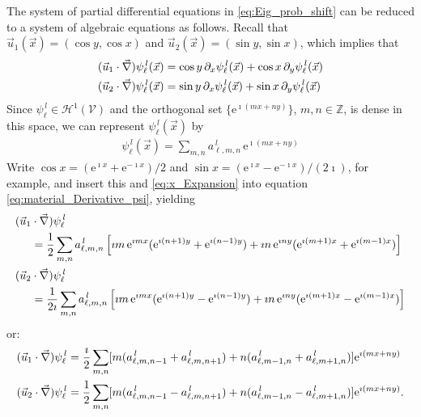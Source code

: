 \documentclass{article}
\newcommand{\e}{\mathrm{e}}
\newcommand{\Hc}{\mathcal{H}}
\newcommand{\Vc}{\mathcal{V}}
\newcommand{\0}{\mathbf{0}}
\newcommand{\1}{\mathbf{1}}
\newcommand{\2}{\mathbf{2}}
\newcommand{\3}{\mathbf{3}}
\newcommand{\4}{\mathbf{4}}
\newcommand{\5}{\mathbf{5}}
\newcommand{\6}{\mathbf{6}}
\newcommand{\7}{\mathbf{7}}
\newcommand{\8}{\mathbf{8}}
\begin{document}
The system of partial differential equations in
\eqref{eq:Eig_prob_shift} can be reduced to a system of algebraic
equations as follows. Recall that
$\vec{u}_1(\vec{x})=(\cos{y},\cos{x})$ and
$\vec{u}_2(\vec{x})=(\sin{y},\sin{x})$, which implies that
%
\begin{align}\label{eq:material_Derivative_psi}
  (\vec{u}_1\cdot\vec{\nabla})\psi_\ell^{\,l}(\vec{x})
          &=\cos{y}\,\partial_x\psi_\ell^{\,l}(\vec{x})+\cos{x}\,\partial_y\psi_\ell^{\,l}(\vec{x})\\
  (\vec{u}_2\cdot\vec{\nabla})\psi_\ell^{\,l}(\vec{x})
          &=\sin{y}\,\partial_x\psi_\ell^{\,l}(\vec{x})+\sin{x}\,\partial_y\psi_\ell^{\,l}(\vec{x})\notag
\end{align}
%
Since $\psi_\ell^{\,l}\in\Hc^1(\Vc)$ and the orthogonal set $\{\e^{\imath (mx+ny)}\}$,
$m,n\in\mathbb{Z}$, is dense in this space, we can represent
$\psi_\ell^{\,l}(\vec{x})$ by
%
\begin{align}\label{eq:x_Expansion}
  \psi_\ell^{\,l}(\vec{x})=\sum_{m,n}a^{\,l}_{\ell,m,n}\,\e^{\imath (mx+ny)}
\end{align}
%
Write $\cos{x}=(\e^{\imath x}+\e^{-\imath x})/2$ and
$\sin{x}=(\e^{\imath x}-\e^{-\imath x})/(2\imath)$, for example, and insert this
and \eqref{eq:x_Expansion} into equation
\eqref{eq:material_Derivative_psi}, yielding
%
\begin{align}
  (\vec{u}_1&\cdot\vec{\nabla})\psi_\ell^{\,l}\\
    &=\frac{1}{2}\sum_{m,n}a^{\,l}_{\ell,m,n}\left[
        \imath m\,\e^{\imath mx}(\e^{\imath(n+1)y}+\e^{\imath(n-1)y})
        +\imath n\,\e^{\imath ny}(\e^{\imath(m+1)x}+\e^{\imath(m-1)x})
                       \right]
    \notag\\
%    
  (\vec{u}_2&\cdot\vec{\nabla})\psi_\ell^{\,l}\notag\\
    &=\frac{1}{2\imath}\sum_{m,n}a^{\,l}_{\ell,m,n}\left[
        \imath m\,\e^{\imath mx}(\e^{\imath(n+1)y}-\e^{\imath(n-1)y})
        +\imath n\,\e^{\imath ny}(\e^{\imath(m+1)x}-\e^{\imath(m-1)x})
                       \right]
                       \notag
\end{align}
%
or:
%
\begin{align}\label{eq:Algebraic_advection}
  (\vec{u}_1\cdot\vec{\nabla})\psi_\ell^{\,l}
    &=\frac{\imath}{2}\sum_{m,n}
    [m(a^{\,l}_{\ell,m,n-1}+a^{\,l}_{\ell,m,n+1})+n(a^{\,l}_{\ell,m-1,n}+a^{\,l}_{\ell,m+1,n})]\e^{\imath (mx+ny)}
   \notag\\
  (\vec{u}_2\cdot\vec{\nabla})\psi_\ell^{\,l}
    &=\frac{1}{2}\sum_{m,n}
    [m(a^{\,l}_{\ell,m,n-1}-a^{\,l}_{\ell,m,n+1})+n(a^{\,l}_{\ell,m-1,n}-a^{\,l}_{\ell,m+1,n})]\e^{\imath (mx+ny)} .
\end{align}
\end{document}
